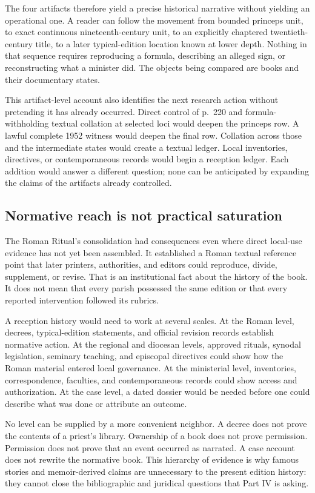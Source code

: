 The four artifacts therefore yield a precise historical narrative without
yielding an operational one. A reader can follow the movement from bounded
princeps unit, to exact continuous nineteenth-century unit, to an explicitly
chaptered twentieth-century title, to a later typical-edition location known
at lower depth. Nothing in that sequence requires reproducing a formula,
describing an alleged sign, or reconstructing what a minister did. The
objects being compared are books and their documentary states.

This artifact-level account also identifies the next research action without
pretending it has already occurred. Direct control of p.~220 and
formula-withholding textual collation at selected loci would deepen the
princeps row. A lawful complete 1952 witness would deepen the final row.
Collation across those and the intermediate states would create a
textual ledger. Local inventories, directives, or contemporaneous records
would begin a reception ledger. Each addition would answer a different
question; none can be anticipated by expanding the claims of the artifacts
already controlled.

\subsection{Normative reach is not practical saturation}

The Roman Ritual's consolidation had consequences even where direct local-use
evidence has not yet been assembled. It established a Roman textual reference
point that later printers, authorities, and editors could reproduce, divide,
supplement, or revise. That is an institutional fact about the history of the
book. It does not mean that every parish possessed the same edition or that
every reported intervention followed its rubrics.

A reception history would need to work at several scales. At the Roman level,
decrees, typical-edition statements, and official revision records establish
normative action. At the regional and diocesan levels, approved rituals,
synodal legislation, seminary teaching, and episcopal directives could show
how the Roman material entered local governance. At the ministerial level,
inventories, correspondence, faculties, and contemporaneous records could
show access and authorization. At the case level, a dated dossier would be
needed before one could describe what was done or attribute an outcome.

No level can be supplied by a more convenient neighbor. A decree does not
prove the contents of a priest's library. Ownership of a book does not prove
permission. Permission does not prove that an event occurred as narrated. A
case account does not rewrite the normative book. This hierarchy of evidence
is why famous stories and memoir-derived claims are unnecessary to the present
edition history: they cannot close the bibliographic and juridical questions
that Part IV is asking.

